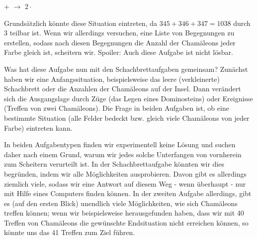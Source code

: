 \documentclass[a4paper,ngerman,12pt]{scrartcl}
\theoremstyle{definition}
\theoremstyle{plain}
\theoremstyle{remark}
\begin{document}
\begin{center}
   +  $\longrightarrow$ $2 \cdot$ 
\end{center}

Grundsätzlich könnte diese Situation eintreten, da $345 + 346 + 347 = 1038$ durch $3$ teilbar ist. Wenn wir allerdings versuchen, eine Liste von Begegnungen zu erstellen, sodass nach diesen Begegnungen die Anzahl der Chamäleons jeder Farbe gleich ist, scheitern wir. Spoiler: Auch diese Aufgabe ist nicht lösbar.

Was hat diese Aufgabe nun mit den Schachbrettaufgaben gemeinsam? Zunächst haben wir eine Anfangssituation, beispielsweise das leere (verkleinerte) Schachbrett oder die Anzahlen der Chamäleons auf der Insel. Dann verändert sich die Ausgangslage durch Züge (das Legen eines Dominosteins) oder Ereignisse (Treffen von zwei Chamäleons). Die Frage in beiden Aufgaben ist, ob eine bestimmte Situation (alle Felder bedeckt bzw. gleich viele Chamäleons von jeder Farbe) eintreten kann.

In beiden Aufgabentypen finden wir experimentell keine Lösung und suchen daher nach einem Grund, warum wir jedes solche Unterfangen von vornherein zum Scheitern verurteilt ist. In der Schachbrettaufgabe könnten wir dies begründen, indem wir alle Möglichkeiten ausprobieren. Davon gibt es allerdings ziemlich viele, sodass wir eine Antwort auf diesem Weg - wenn überhaupt - nur mit Hilfe eines Computers finden können. In der zweiten Aufgabe allerdings, gibt es (auf den ersten Blick) unendlich viele Möglichkeiten, wie sich Chamäleons treffen können; wenn wir beispielsweise herausgefunden haben, dass wir mit 40 Treffen von Chamäleons die gewünschte Endsituation nicht erreichen können, so könnte uns das 41 Treffen zum Ziel führen.
\end{document}
